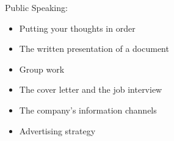 Public Speaking:
\begin{itemize}
    \item Putting your thoughts in order
    \item The written presentation of a document
    \item Group work
    \item The cover letter and the job interview
    \item The company's information channels
    \item Advertising strategy
\end{itemize}